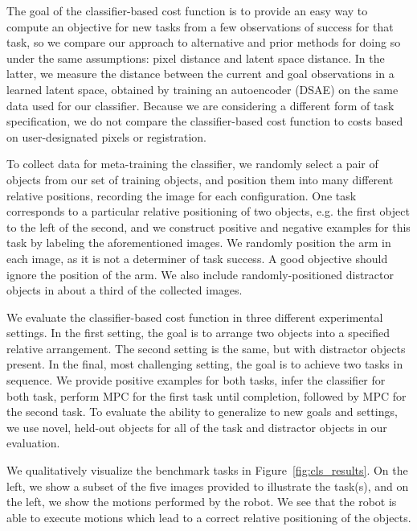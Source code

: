 
The goal of the classifier-based cost function is to provide an easy way to compute an objective for new tasks from a few observations of success for that task, so we compare our approach to alternative and prior methods for doing so under the same assumptions: pixel distance and latent space distance. In the latter, we measure the distance between the current and goal observations in a learned latent space, obtained by training an autoencoder (DSAE) \cite{dsae} on the same data used for our classifier. Because we are considering a different form of task specification, we do not compare the classifier-based cost function to costs based on user-designated pixels or registration.

To collect data for meta-training the classifier, we randomly select a pair of objects from our set of training objects, and position them into many different relative positions, recording the image for each configuration. One task corresponds to a particular relative positioning of two objects, e.g. the first object to the left of the second, and we construct positive and negative examples for this task by labeling the aforementioned images. We randomly position the arm in each image, as it is not a determiner of task success. A good objective should ignore the position of the arm. We also include randomly-positioned distractor objects in about a third of the collected images.

We evaluate the classifier-based cost function in three different experimental settings. In the first setting, the goal is to arrange two objects into a specified relative arrangement. The second setting is the same, but with distractor objects present. In the final, most challenging setting, the goal is to achieve two tasks in sequence. We provide positive examples for both tasks, infer the classifier for both task, perform MPC for the first task until completion, followed by MPC for the second task. To evaluate the ability to generalize to new goals and settings, we use novel, held-out objects for all of the task and distractor objects in our evaluation. 

We qualitatively visualize the benchmark tasks in Figure~\ref{fig:cls_results}.
On the left, we show a subset of the five images provided to illustrate the task(s), and on the left, we show the motions performed by the robot. We see that the robot is able to execute motions which lead to a correct relative positioning of the objects.

